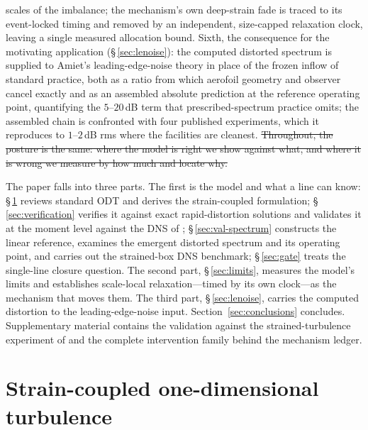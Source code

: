 \documentclass[lineno]{JFM-FLM_Au}
\providecommand{\DIFdel}[1]{{\protect\color{red}\sout{#1}}} %
\providecommand{\DIFdelbegin}{} %
\providecommand{\DIFdelend}{} %
\begin{document}
scales of the imbalance; the mechanism's own deep-strain fade is
traced to its event-locked timing and removed by an independent,
size-capped relaxation clock, leaving a single measured allocation
bound. Sixth, the
consequence for the motivating application (\S\,\ref{sec:lenoise}):
the computed distorted spectrum is supplied to Amiet's
leading-edge-noise theory in place of the frozen inflow of standard
practice, both as a ratio from which aerofoil geometry and observer
cancel exactly and as an assembled absolute prediction at the
reference operating point, quantifying the
$5$--$20$\,dB term that prescribed-spectrum practice omits; the
assembled chain is confronted with four published experiments, which
it reproduces to $1$--$2$\,dB rms where the facilities are cleanest.
\DIFdelbegin \DIFdel{Throughout, the posture is the same: where the model is right we show
against what, and where it is wrong we measure by how much and locate
why.
}\DIFdelend 

The paper falls into three parts. The first is the model and what a
line can know: \S\,\ref{sec:formulation} reviews standard ODT and
derives the strain-coupled formulation; \S\,\ref{sec:verification}
verifies it against exact rapid-distortion solutions and validates it
at the moment level against the DNS of \citet{LeeReynolds1985};
\S\,\ref{sec:val-spectrum} constructs the linear reference, examines
the emergent distorted spectrum and its operating point, and carries
out the strained-box DNS benchmark; \S\,\ref{sec:gate} treats the
single-line closure question. The second part,
\S\,\ref{sec:limits}, measures the model's limits and establishes
scale-local relaxation---timed by its own clock---as the mechanism
that moves them. The third part, \S\,\ref{sec:lenoise}, carries the
computed distortion to the leading-edge-noise input.
Section~\ref{sec:conclusions} concludes. Supplementary material
contains the validation against the strained-turbulence experiment of
\citet{ChenMeneveauKatz2006} and the complete intervention family
behind the mechanism ledger.

\section{Strain-coupled one-dimensional turbulence}\label{sec:formulation}
\end{document}
